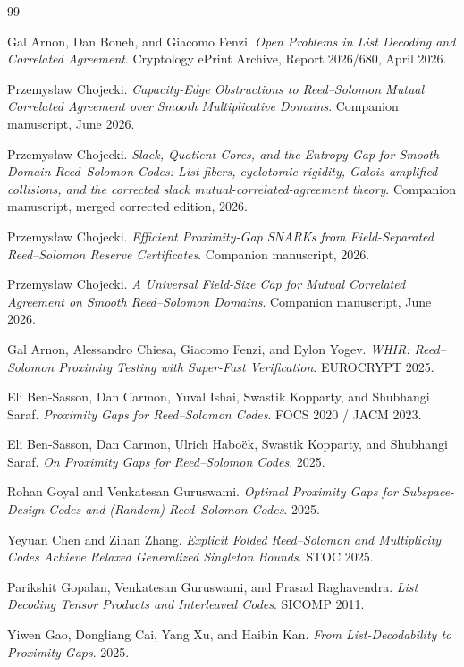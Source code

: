 \documentclass[11pt]{article}
\theoremstyle{definition}
\theoremstyle{remark}
\begin{document}
\begin{thebibliography}{99}

Gal Arnon, Dan Boneh, and Giacomo Fenzi.
\emph{Open Problems in List Decoding and Correlated Agreement}. Cryptology ePrint Archive, Report 2026/680, April 2026.

Przemys\l{}aw Chojecki.
\emph{Capacity-Edge Obstructions to Reed--Solomon Mutual Correlated Agreement over Smooth Multiplicative Domains}. Companion manuscript, June 2026.

Przemys\l{}aw Chojecki.
\emph{Slack, Quotient Cores, and the Entropy Gap for Smooth-Domain Reed--Solomon Codes: List fibers, cyclotomic rigidity, Galois-amplified collisions, and the corrected slack mutual-correlated-agreement theory}. Companion manuscript, merged corrected edition, 2026.

Przemys\l{}aw Chojecki.
\emph{Efficient Proximity-Gap SNARKs from Field-Separated Reed--Solomon Reserve Certificates}. Companion manuscript, 2026.

Przemys\l{}aw Chojecki.
\emph{A Universal Field-Size Cap for Mutual Correlated Agreement on Smooth Reed--Solomon Domains}. Companion manuscript, June 2026.

Gal Arnon, Alessandro Chiesa, Giacomo Fenzi, and Eylon Yogev.
\emph{WHIR: Reed--Solomon Proximity Testing with Super-Fast Verification}. EUROCRYPT 2025.

Eli Ben-Sasson, Dan Carmon, Yuval Ishai, Swastik Kopparty, and Shubhangi Saraf.
\emph{Proximity Gaps for Reed--Solomon Codes}. FOCS 2020 / JACM 2023.

Eli Ben-Sasson, Dan Carmon, Ulrich Habo\"ck, Swastik Kopparty, and Shubhangi Saraf.
\emph{On Proximity Gaps for Reed--Solomon Codes}. 2025.

Rohan Goyal and Venkatesan Guruswami.
\emph{Optimal Proximity Gaps for Subspace-Design Codes and (Random) Reed--Solomon Codes}. 2025.

Yeyuan Chen and Zihan Zhang.
\emph{Explicit Folded Reed--Solomon and Multiplicity Codes Achieve Relaxed Generalized Singleton Bounds}. STOC 2025.

Parikshit Gopalan, Venkatesan Guruswami, and Prasad Raghavendra.
\emph{List Decoding Tensor Products and Interleaved Codes}. SICOMP 2011.

Yiwen Gao, Dongliang Cai, Yang Xu, and Haibin Kan.
\emph{From List-Decodability to Proximity Gaps}. 2025.


\end{thebibliography}
\end{document}
